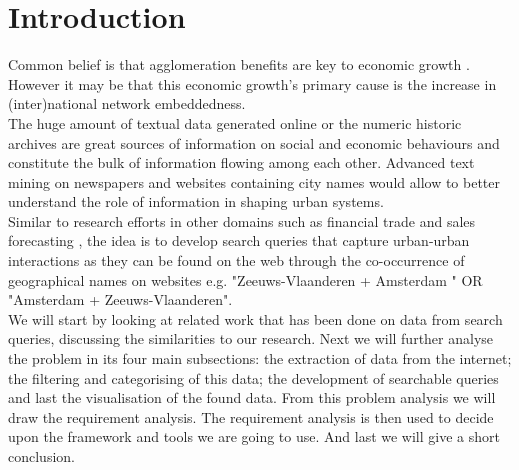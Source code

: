 \section{Introduction}


Common belief is that agglomeration benefits are key to economic growth \cite{porter2000location}. However it may be that this economic growth's primary cause is the increase in (inter)national network embeddedness. \\

The huge amount of textual data generated online or the numeric historic archives are great sources of information on social and economic behaviours and constitute the bulk of information flowing among each other. Advanced text mining on newspapers and websites containing city names would allow to better understand the role of information in shaping urban systems. \\
Similar to research efforts in other domains such as financial trade \cite{preis2013quantifying} and sales forecasting \cite{wu2014future}, the idea is to develop search queries that capture urban-urban interactions as they can be found on the web through the co-occurrence of geographical names on websites e.g. "Zeeuws-Vlaanderen + Amsterdam " OR "Amsterdam + Zeeuws-Vlaanderen". \\

We will start by looking at related work that has been done on data from search queries, discussing the similarities to our research. Next we will further analyse the problem in its four main subsections: the extraction of data from the internet; the filtering and categorising of this data; the development of searchable queries and last the visualisation of the found data. From this problem analysis we will draw the requirement analysis. The requirement analysis is then used to decide upon the framework and tools we are going to use. And last we will give a short conclusion.